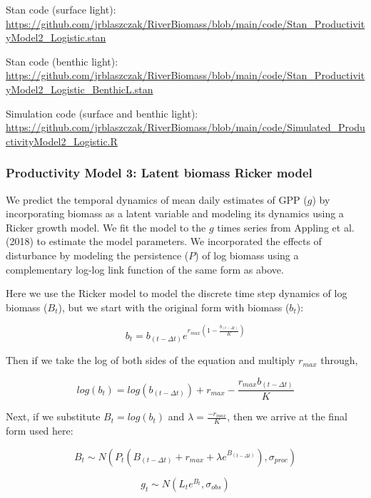 \documentclass[]{article}
\begin{document}
Stan code (surface light):
\url{https://github.com/jrblaszczak/RiverBiomass/blob/main/code/Stan_ProductivityModel2_Logistic.stan}

Stan code (benthic light):
\url{https://github.com/jrblaszczak/RiverBiomass/blob/main/code/Stan_ProductivityModel2_Logistic_BenthicL.stan}

Simulation code (surface and benthic light):
\url{https://github.com/jrblaszczak/RiverBiomass/blob/main/code/Simulated_ProductivityModel2_Logistic.R}

\subsubsection{Productivity Model 3: Latent biomass Ricker
model}\label{productivity-model-3-latent-biomass-ricker-model}

We predict the temporal dynamics of mean daily estimates of GPP (\(g\))
by incorporating biomass as a latent variable and modeling its dynamics
using a Ricker growth model. We fit the model to the \(g\) times series
from Appling et al. (2018) to estimate the model parameters. We
incorporated the effects of disturbance by modeling the persistence
(\(P\)) of log biomass using a complementary log-log link function of
the same form as above.

Here we use the Ricker model to model the discrete time step dynamics of
log biomass (\(B_t\)), but we start with the original form with biomass
(\(b_t\)):

\begin{equation}
    b_{t} = b_{(t-\Delta t)}e^{r_{max}(1-\frac{b_{(t-\Delta t)}}{K})}
\end{equation}

Then if we take the log of both sides of the equation and multiply
\(r_{max}\) through,

\begin{equation}
    log(b_{t}) = log(b_{(t-\Delta t)})+r_{max}-\frac{r_{max}b_{(t-\Delta t)}}{K}
\end{equation}

Next, if we substitute \(B_t = log(b_t)\) and
\(\lambda = \frac{-r_{max}}{K}\), then we arrive at the final form used
here:

\begin{equation}
    B_{t} \sim N(P_{t}(B_{(t-\Delta t)} + r_{max} + \lambda e^{B_{(t-\Delta t)}}), \sigma_{proc})
\end{equation}

\begin{equation}
    g_{t} \sim N(L_{t}e^{B_{t}},\sigma_{obs})
\end{equation}
\end{document}
